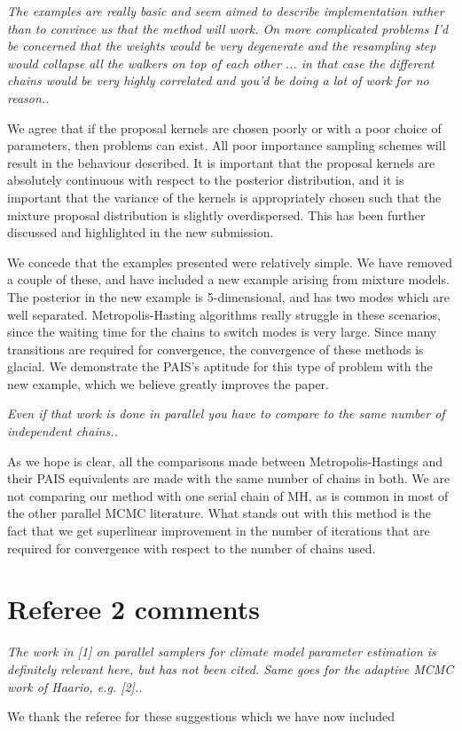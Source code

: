 \documentclass{article}
\newcommand{\comment}[2]{\vspace{0.6cm}{\bf Comment:} {\it #1.}

\vspace{0.3cm}{\bf Answer:} #2}
\begin{document}
\comment{The examples are really basic and seem aimed to describe implementation rather than to convince us that the method will work. On more complicated problems I'd be concerned that the weights would be very degenerate and the resampling step would collapse all the walkers on top of each other ... in that case the different chains would be very highly correlated and you'd be doing a lot of work for no reason.}{We agree that if the proposal kernels are chosen poorly or with a poor choice of parameters, then problems can exist. All poor importance sampling schemes will result in the behaviour described. It is important that the proposal kernels are absolutely continuous with respect to the posterior distribution, and it is important that the variance of the kernels is appropriately chosen such that the mixture proposal distribution is slightly overdispersed. This has been further discussed and highlighted in the new submission.

We concede that the examples presented were relatively simple. We have removed a couple of these, and have included a new example arising from mixture models. The posterior in the new example is 5-dimensional, and has two modes which are well separated. Metropolis-Hasting algorithms really struggle in these scenarios, since the waiting time for the chains to switch modes is very large. Since many transitions are required for convergence, the convergence of these methods is glacial. We demonstrate the PAIS's aptitude for this type of problem with the new example, which we believe greatly improves the paper.}

\comment{Even if that work is done in parallel you have to compare to the same number of independent chains.}{As we hope is clear, all the comparisons made between Metropolis-Hastings and their PAIS equivalents are made with the same number of chains in both. We are not comparing our method with one serial chain of MH, as is common in most of the other parallel MCMC literature. What stands out with this method is the fact that we get superlinear improvement in the number of iterations that are required for convergence with respect to the number of chains used.}

\section*{Referee 2 comments}

\comment{The work in [1] on parallel samplers for climate model parameter estimation is definitely relevant here, but has not been cited. Same goes for the adaptive MCMC work of Haario, e.g. [2].}{We thank the referee for these suggestions which we have now included}
\end{document}

